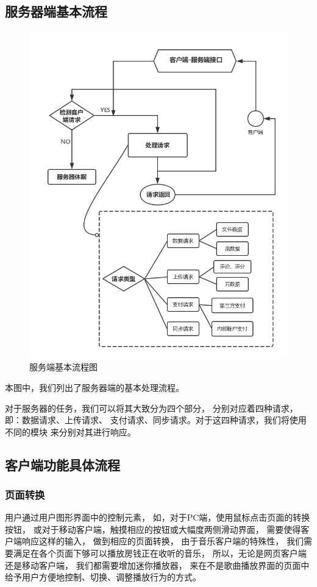 \subsection{服务器端基本流程}
\begin{figure}[h!]
\centering
\includegraphics[width=13cm]{images/do_4}
\caption{服务端基本流程图}
\end{figure}

本图中，我们列出了服务器端的基本处理流程。

对于服务器的任务，我们可以将其大致分为四个部分，
分别对应着四种请求，即：数据请求、上传请求、
支付请求、同步请求。对于这四种请求，我们将使用不同的模块
来分别对其进行响应。

\newpage
\subsection{客户端功能具体流程}
\subsubsection{页面转换} %
\label{ssub:页面转换}
用户通过用户图形界面中的控制元素，
如，对于PC端，使用鼠标点击页面的转换按钮，
或对于移动客户端，触摸相应的按钮或大幅度两侧滑动界面，
需要使得客户端响应这样的输入，
做到相应的页面转换，
由于音乐客户端的特殊性，
我们需要满足在各个页面下够可以播放房钱正在收听的音乐，
所以，无论是网页客户端还是移动客户端，
我们都需要增加迷你播放器，
来在不是歌曲播放界面的页面中给予用户方便地控制、切换、调整播放行为的方式。

